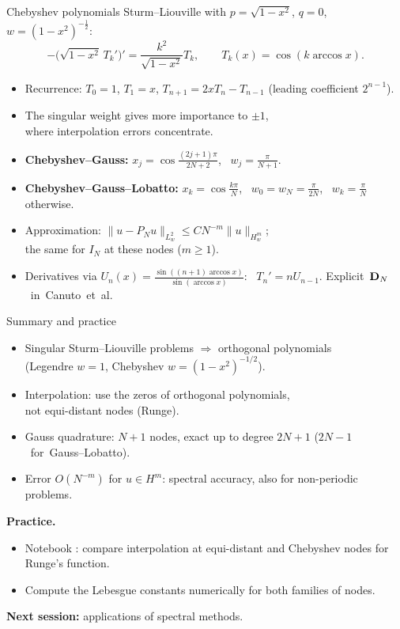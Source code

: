 \begin{frame}{Chebyshev polynomials}
    Sturm--Liouville with $p = \sqrt{1-x^2}$, $q = 0$, $w = (1 - x^2)^{-\frac12}$:
    \[
        -\big(\sqrt{1-x^2}\, T_k'\big)' = \frac{k^2}{\sqrt{1-x^2}} T_k,
        \qquad
        T_k(x) = \cos(k \arccos x).
    \]
    \begin{itemize}
        \item Recurrence: $T_0 = 1$, $T_1 = x$, $T_{n+1} = 2x T_n - T_{n-1}$ (leading coefficient $2^{n-1}$).
        \item The singular weight gives more importance to $\pm1$,\\ where interpolation errors concentrate.
        \item \textbf{Chebyshev--Gauss:} $x_j = \cos\frac{(2j+1)\pi}{2N+2}$, \ $w_j = \frac{\pi}{N+1}$.
        \item \textbf{Chebyshev--Gauss--Lobatto:} $x_k = \cos\frac{k\pi}{N}$, \ $w_0 = w_N = \frac{\pi}{2N}$, \ $w_k = \frac{\pi}{N}$ otherwise.
        \item Approximation: $\|u - P_N u\|_{L^2_w} \le C N^{-m}\|u\|_{H^m_w}$;\\ the same for $I_N$ at these nodes ($m \ge 1$).
        \item Derivatives via $U_n(x) = \frac{\sin((n+1)\arccos x)}{\sin(\arccos x)}$: \ $T_n' = n U_{n-1}$. \mbox{Explicit $\mathbf{D}_N$ in Canuto et al.}
    \end{itemize}
\end{frame}

\begin{frame}{Summary and practice}
    \begin{itemize}
        \item Singular Sturm--Liouville problems $\Rightarrow$ orthogonal polynomials\\ (Legendre $w = 1$, Chebyshev $w = (1-x^2)^{-1/2}$).
        \item Interpolation: use the zeros of orthogonal polynomials,\\ not equi-distant nodes (Runge).
        \item Gauss quadrature: $N+1$ nodes, exact up to degree $2N+1$ \mbox{($2N-1$ for Gauss--Lobatto).}
        \item Error $O(N^{-m})$ for $u \in H^m$: spectral accuracy, also for non-periodic problems.
    \end{itemize}
    \bigskip
    \textbf{Practice.}
    \begin{itemize}
        \item Notebook : compare interpolation at equi-distant and Chebyshev nodes for Runge's function.
        \item Compute the Lebesgue constants numerically for both families of nodes.
    \end{itemize}
    \bigskip
    \textbf{Next session:} applications of spectral methods.
\end{frame}
